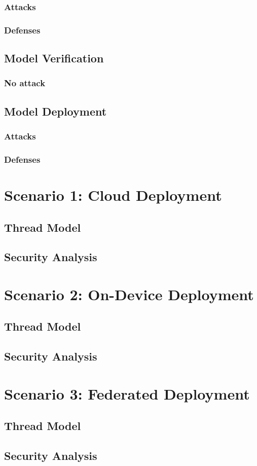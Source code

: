 \documentclass[11pt]{article}
\begin{document}
\subsubsection{Attacks}
\label{sec:org9b88810}
\subsubsection{Defenses}
\label{sec:orge14c44c}
\subsection{Model Verification}
\label{sec:orgfedec36}
\subsubsection{No attack}
\label{sec:org2772d49}
\subsection{Model Deployment}
\label{sec:org5c0da21}
\subsubsection{Attacks}
\label{sec:orgd9b9fb0}
\subsubsection{Defenses}
\label{sec:org1146cdf}
\section{Scenario 1: Cloud Deployment}
\label{sec:org2c1afc0}
\subsection{Thread Model}
\label{sec:org9c88111}
\subsection{Security Analysis}
\label{sec:org2278570}
\section{Scenario 2: On-Device Deployment}
\label{sec:orgf2efda1}
\subsection{Thread Model}
\label{sec:org951998a}
\subsection{Security Analysis}
\label{sec:org1d54225}
\section{Scenario 3: Federated Deployment}
\label{sec:orge212915}
\subsection{Thread Model}
\label{sec:org0daeb2b}
\subsection{Security Analysis}
\label{sec:org017bbd4}
\end{document}
